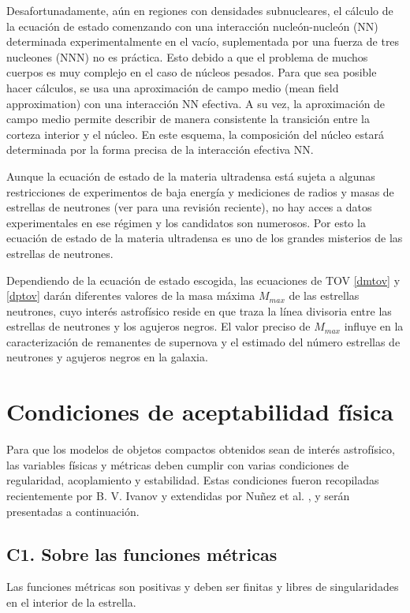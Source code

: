 Desafortunadamente, aún en regiones con densidades subnucleares, el cálculo de la ecuación de estado comenzando con una interacción nucleón-nucleón (NN) determinada experimentalmente en el vacío, suplementada por una fuerza de tres nucleones (NNN) no es práctica. Esto debido a que el problema de muchos cuerpos es muy complejo en el caso de núcleos pesados. Para que sea posible hacer cálculos, se usa una aproximación de campo medio (mean field approximation)  con una interacción NN efectiva. A su vez, la aproximación de campo medio permite describir de manera consistente la transición entre la corteza interior y el núcleo. En este esquema, la composición del núcleo estará determinada por la forma precisa de la interacción efectiva NN.

Aunque la ecuación de estado de la materia ultradensa está sujeta a algunas restricciones de experimentos de baja energía y mediciones de radios y masas de estrellas de neutrones (ver \cite{Ozel2016} para una revisión reciente), no hay acces a datos experimentales en ese régimen y los candidatos son numerosos. Por esto la ecuación de estado de la materia ultradensa es uno de los grandes misterios de las estrellas de neutrones. 

Dependiendo de la ecuación de estado escogida, las ecuaciones de TOV \eqref{dmtov} y \eqref{dptov} darán diferentes valores de la masa máxima $M_{max}$ de las estrellas neutrones, cuyo interés astrofísico reside en que traza la línea divisoria entre las estrellas de neutrones y los agujeros negros. El valor preciso de $M_{max}$ influye en la caracterización de remanentes de supernova y el estimado del número estrellas de neutrones y agujeros negros en la galaxia. 

\section{Condiciones de aceptabilidad física}
Para que los modelos de objetos compactos obtenidos sean de interés astrofísico, las variables físicas y métricas deben cumplir con varias condiciones de regularidad, acoplamiento y estabilidad. Estas condiciones fueron recopiladas recientemente por B. V. Ivanov \cite{Ivanov2017} y extendidas por Nuñez et al. \cite{Hernandez2018}, y serán presentadas a continuación. 

\subsection*{C1. Sobre las funciones métricas}
Las funciones métricas son positivas y deben ser finitas y libres de singularidades en el interior de la estrella.

